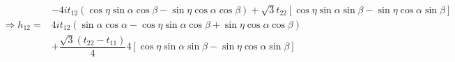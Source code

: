 \documentclass{report}
\begin{document}
\begin{align*}
	                     & - 4it_{12}(\cos\eta\sin\alpha\cos\beta - \sin\eta\cos\alpha\cos\beta) + \sqrt{3} t_{22}\left[ \cos\eta\sin\alpha\sin\beta - \sin\eta\cos\alpha\sin\beta \right]                                                                                                         \\
	\Rightarrow h_{12} = & 4it_{12}(\sin\alpha\cos\alpha - \cos\eta\sin\alpha\cos\beta + \sin\eta\cos\alpha\cos\beta )                                                                                                                                                                             \\
	                     & + \dfrac{\sqrt{3} (t_{22} - t_{11}) }{4}4\left[ \cos\eta\sin\alpha\sin\beta - \sin\eta\cos\alpha\sin\beta  \right]                                                                                                                                                      \\
\end{align*}
\end{document}
